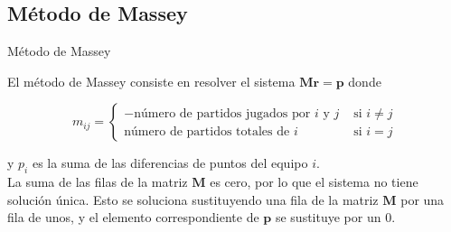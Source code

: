 \documentclass[10pt]{beamer}
\begin{document}
	
	\subsection{Método de Massey}
	
	\begin{frame}{Método de Massey}
		
		El método de Massey consiste en resolver el sistema $\mathbf{M r} = \mathbf{p}$
		donde 
		
		\[ m_{ij} = \begin{cases}
		- \text{número de partidos jugados por } i \text{ y } j & \text{ si } i \neq j \\
	      \text{número de partidos totales de } i & \text{ si } i = j 
		
		\end{cases}\]
		
		y $p_i$ es la suma de las diferencias de puntos del equipo $i$.\\
		
		La suma de las filas de la matriz $\mathbf{M}$ es cero, por lo que el sistema no tiene solución única. Esto se soluciona sustituyendo una fila de la matriz $\mathbf{M}$ por una fila de unos, y el elemento correspondiente de $\mathbf{p}$ se sustituye por un $0$.
	
	\end{frame}
	
\end{document}
